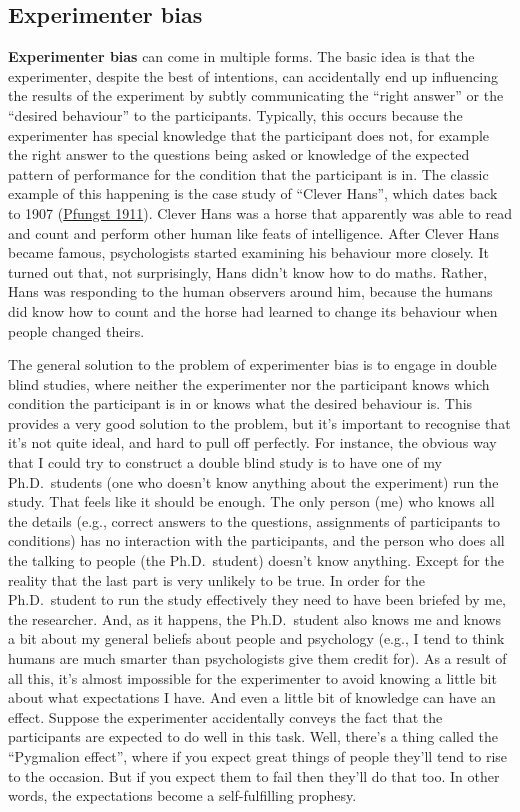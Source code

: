 \documentclass[
]{book}
\begin{document}
\hypertarget{experimenter-bias}{%
\subsection{Experimenter bias}\label{experimenter-bias}}

\textbf{Experimenter bias} can come in multiple forms. The basic idea is that the experimenter, despite the best of intentions, can accidentally end up influencing the results of the experiment by subtly communicating the ``right answer'' or the ``desired behaviour'' to the participants. Typically, this occurs because the experimenter has special knowledge that the participant does not, for example the right answer to the questions being asked or knowledge of the expected pattern of performance for the condition that the participant is in. The classic example of this happening is the case study of ``Clever Hans'', which dates back to 1907 (\protect\hyperlink{ref-Pfungst1911}{Pfungst 1911}). Clever Hans was a horse that apparently was able to read and count and perform other human like feats of intelligence. After Clever Hans became famous, psychologists started examining his behaviour more closely. It turned out that, not surprisingly, Hans didn't know how to do maths. Rather, Hans was responding to the human observers around him, because the humans did know how to count and the horse had learned to change its behaviour when people changed theirs.

The general solution to the problem of experimenter bias is to engage in double blind studies, where neither the experimenter nor the participant knows which condition the participant is in or knows what the desired behaviour is. This provides a very good solution to the problem, but it's important to recognise that it's not quite ideal, and hard to pull off perfectly. For instance, the obvious way that I could try to construct a double blind study is to have one of my Ph.D.~students (one who doesn't know anything about the experiment) run the study. That feels like it should be enough. The only person (me) who knows all the details (e.g., correct answers to the questions, assignments of participants to conditions) has no interaction with the participants, and the person who does all the talking to people (the Ph.D.~student) doesn't know anything. Except for the reality that the last part is very unlikely to be true. In order for the Ph.D.~student to run the study effectively they need to have been briefed by me, the researcher. And, as it happens, the Ph.D.~student also knows me and knows a bit about my general beliefs about people and psychology (e.g., I tend to think humans are much smarter than psychologists give them credit for). As a result of all this, it's almost impossible for the experimenter to avoid knowing a little bit about what expectations I have. And even a little bit of knowledge can have an effect. Suppose the experimenter accidentally conveys the fact that the participants are expected to do well in this task. Well, there's a thing called the ``Pygmalion effect'', where if you expect great things of people they'll tend to rise to the occasion. But if you expect them to fail then they'll do that too. In other words, the expectations become a self-fulfilling prophesy.
\end{document}

